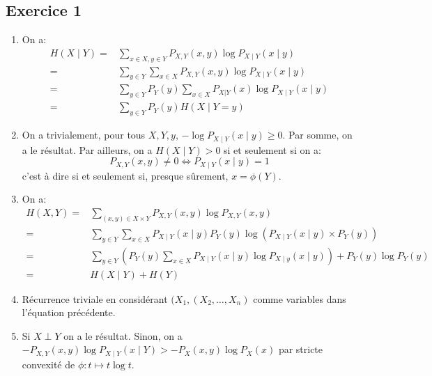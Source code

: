 \documentclass{cours}
\begin{document}
\subsection{Exercice 1}
\begin{enumerate}
	\item On a: 
	\begin{equation*}
		\begin{aligned}
			H(X \mid Y) =& \sum_{x \in X, y \in Y} P_{X, Y}(x, y) \log P_{X \mid Y}(x \mid y)\\
			=& \sum_{y \in Y} \sum_{x \in X} P_{X, Y}(x, y) \log P_{X \mid Y}(x\mid y)\\
			=& \sum_{y \in Y} P_{Y}(y) \sum_{x \in X}P_{X|Y}(x)\log P_{X \mid Y}(x \mid y)\\
			=& \sum_{y \in Y} P_{Y}(y) H(X \mid Y = y)
		\end{aligned}
	\end{equation*}

	\item On a trivialement, pour tous $X, Y, y$, $-\log P_{X \mid Y}(x\mid y) \geq 0$. Par somme, on a le résultat. 
	Par ailleurs, on a $H(X \mid Y) > 0$ si et seulement si on a:
	\begin{equation*}
		P_{X, Y}(x, y) \neq 0 \Leftrightarrow P_{X\mid Y}(x\mid y) = 1
	\end{equation*}
	c'est à dire si et seulement si, presque sûrement, $x = \phi(Y)$. 

	\item On a: 
	\begin{equation*}
		\begin{aligned}
			H(X, Y) =& \sum_{(x, y) \in X \times Y} P_{X, Y}(x, y) \log P_{X, Y}(x, y)\\
			=& \sum_{y \in Y} \sum_{x \in X} P_{X\mid Y}(x\mid y) P_{Y}(y)\log \left(P_{X\mid Y}(x\mid y)\times P_{Y}(y)\right)\\
			=& \sum_{y \in Y} \left(P_{Y}(y)\sum_{x \in X} P_{X \mid Y}(x \mid y) \log P_{X \mid y}(x \mid y)\right) + P_{Y}(y)\log P_{Y}(y) \\
			=& H(X \mid Y) + H(Y)
		\end{aligned}
	\end{equation*}

	\item Récurrence triviale en considérant $(X_{1}, (X_{2}, \ldots, X_{n})$ comme variables dans l'équation précédente.
	
	\item Si $X \perp Y$ on a le résultat. Sinon, on a $-P_{X, Y}(x, y)\log P_{X\mid Y}(x\mid Y) > -P_{X}(x, y)\log P_{X}(x)$ par stricte convexité de $\phi: t\mapsto t\log t$. 


\end{enumerate}
\end{document}
